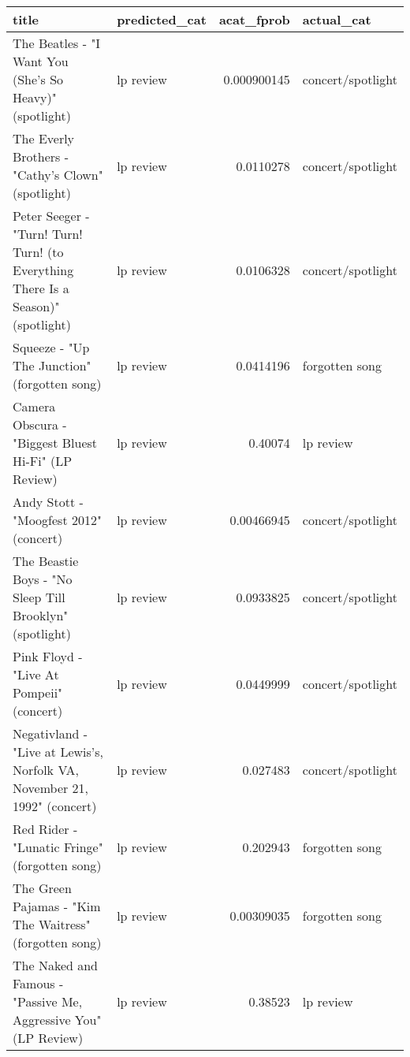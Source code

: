 \documentclass[letterpaper,10pt]{article}
\begin{document}
\begin{table}[H]
\begin{adjustbox}{max width=\linewidth}
\begin{tabular}{llrl}
\hline
 title                                                                            & predicted\_cat             &   acat\_fprob & actual\_cat                \\
\hline
 The Beatles - "I Want You (She's So Heavy)" (spotlight)                          & lp review                 &  0.000900145 & concert/spotlight         \\
 The Everly Brothers - "Cathy's Clown" (spotlight)                                & lp review                 &  0.0110278   & concert/spotlight         \\
 Peter Seeger - "Turn! Turn! Turn! (to Everything There Is a Season)" (spotlight) & lp review                 &  0.0106328   & concert/spotlight         \\
 Squeeze - "Up The Junction" (forgotten song)                                     & lp review                 &  0.0414196   & forgotten song            \\
 Camera Obscura - "Biggest Bluest Hi-Fi" (LP Review)                              & lp review                 &  0.40074     & lp review                 \\
 Andy Stott - "Moogfest 2012" (concert)                                           & lp review                 &  0.00466945  & concert/spotlight         \\
 The Beastie Boys - "No Sleep Till Brooklyn" (spotlight)                          & lp review                 &  0.0933825   & concert/spotlight         \\
 Pink Floyd - "Live At Pompeii" (concert)                                         & lp review                 &  0.0449999   & concert/spotlight         \\
 Negativland - "Live at Lewis's, Norfolk VA, November 21, 1992" (concert)         & lp review                 &  0.027483    & concert/spotlight         \\
 Red Rider - "Lunatic Fringe" (forgotten song)                                    & lp review                 &  0.202943    & forgotten song            \\
 The Green Pajamas - "Kim The Waitress" (forgotten song)                          & lp review                 &  0.00309035  & forgotten song            \\
 The Naked and Famous - "Passive Me, Aggressive You" (LP Review)                  & lp review                 &  0.38523     & lp review                 \\

\end{tabular}
\end{adjustbox}
\end{table}
\end{document}

